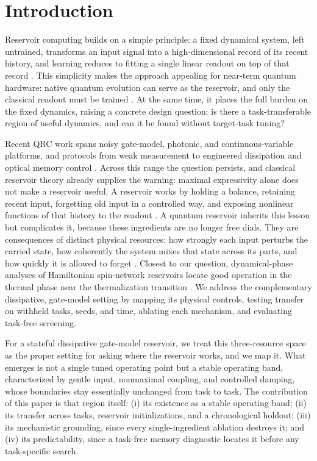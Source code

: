 \documentclass[10pt,conference]{IEEEtran}
\begin{document}
\section{Introduction}
Reservoir computing builds on a simple principle: a fixed dynamical system, left untrained, transforms an input signal into a high-dimensional record of its recent history, and learning reduces to fitting a single linear readout on top of that record \cite{maass2002,jaeger2004,tanaka2019}. This simplicity makes the approach appealing for near-term quantum hardware: native quantum evolution can serve as the reservoir, and only the classical readout must be trained \cite{fujii2017,chen2020}. At the same time, it places the full burden on the fixed dynamics, raising a concrete design question: is there a task-transferable region of useful dynamics, and can it be found without target-task tuning?

Recent QRC work spans noisy gate-model, photonic, and continuous-variable platforms, and protocols from weak measurement to engineered dissipation and optical memory control \cite{chen2020,nokkala2021,mujal2023,sannia2024,paparelle2026}. Across this range the question persists, and classical reservoir theory already supplies the warning: maximal expressivity alone does not make a reservoir useful. A reservoir works by holding a balance, retaining recent input, forgetting old input in a controlled way, and exposing nonlinear functions of that history to the readout \cite{dambre2012,tanaka2019}. A quantum reservoir inherits this lesson but complicates it, because these ingredients are no longer free dials. They are consequences of distinct physical resources: how strongly each input perturbs the carried state, how coherently the system mixes that state across its parts, and how quickly it is allowed to forget \cite{chen2020,sannia2024}. Closest to our question, dynamical-phase analyses of Hamiltonian spin-network reservoirs locate good operation in the thermal phase near the thermalization transition \cite{martinez2021}. We address the complementary dissipative, gate-model setting by mapping its physical controls, testing transfer on withheld tasks, seeds, and time, ablating each mechanism, and evaluating task-free screening.

For a stateful dissipative gate-model reservoir, we treat this three-resource space as the proper setting for asking where the reservoir works, and we map it. What emerges is not a single tuned operating point but a stable operating band, characterized by gentle input, nonmaximal coupling, and controlled damping, whose boundaries stay essentially unchanged from task to task. The contribution of this paper is that region itself: (i) its existence as a stable operating band; (ii) its transfer across tasks, reservoir initializations, and a chronological holdout; (iii) its mechanistic grounding, since every single-ingredient ablation destroys it; and (iv) its predictability, since a task-free memory diagnostic locates it before any task-specific search.
\end{document}
